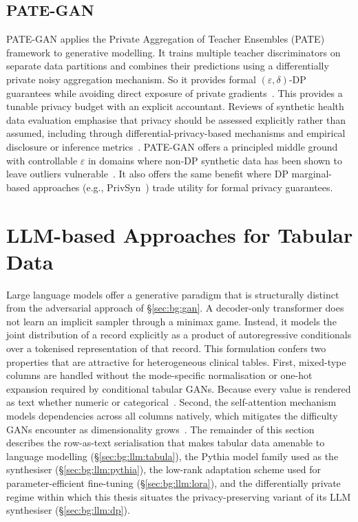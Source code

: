 \subsection{PATE-GAN}
\label{sec:bg:gan:pategan}

\textsc{PATE-GAN} applies the Private Aggregation of Teacher Ensembles
(PATE) framework to generative modelling. It trains multiple teacher
discriminators on separate data partitions and combines their predictions
using a differentially private noisy aggregation mechanism. So it provides formal
$(\varepsilon,\delta)$-DP guarantees while avoiding direct exposure of private
gradients~\cite{pategan,Papernot2017PATE}. This provides a tunable privacy
budget with an explicit accountant. Reviews of synthetic 
health data evaluation emphasise that privacy
should be assessed explicitly rather than assumed, including through
differential-privacy-based mechanisms and empirical disclosure or inference
metrics~\cite{hernandez2022synthetic,Murtaza2023}. 
PATE-GAN offers a principled middle ground with controllable 
$\varepsilon$ in domains where non-DP
synthetic data has been shown to leave outliers
vulnerable~\cite{stadler2022synthetic}. It also offers the same benefit  
where DP marginal-based approaches (e.g., PrivSyn~\cite{privsyn2021}) 
trade utility for formal privacy guarantees.

\section{LLM-based Approaches for Tabular Data}
\label{sec:bg:llm}

Large language models offer a generative paradigm that is structurally
distinct from the adversarial approach of \S\ref{sec:bg:gan}. A decoder-only 
transformer does not learn an implicit sampler through a minimax game. Instead, 
it models the joint distribution of a record explicitly as a product of autoregressive
conditionals over a tokenised representation of that record. This formulation
confers two properties that are attractive for
heterogeneous clinical tables. First, mixed-type columns are handled without
the mode-specific normalisation or one-hot expansion required by conditional
tabular GANs. Because every value is
rendered as text whether numeric or categorical~\cite{Miletic2024}. 
Second, the self-attention mechanism
models dependencies across all columns natively, which mitigates the
difficulty GANs encounter as dimensionality grows~\cite{Miletic2024}.
The remainder of this section describes the row-as-text serialisation that
makes tabular data amenable to language modelling
(\S\ref{sec:bg:llm:tabula}), the Pythia model family used as the synthesiser
(\S\ref{sec:bg:llm:pythia}), the low-rank adaptation scheme used for
parameter-efficient fine-tuning (\S\ref{sec:bg:llm:lora}), and the
differentially private regime within which this thesis situates the
privacy-preserving variant of its LLM synthesiser (\S\ref{sec:bg:llm:dp}).

